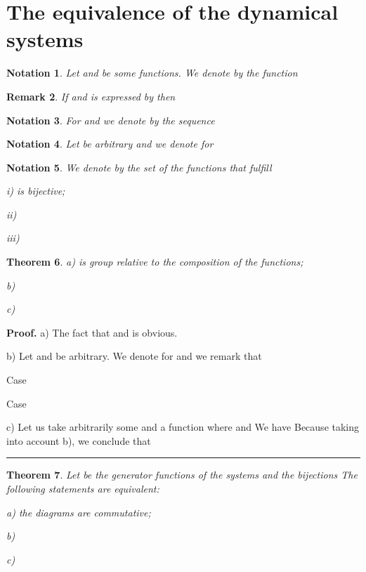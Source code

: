\documentclass[12pt]{article}\usepackage{amsmath}
\newtheorem{theorem}{Theorem}
\newtheorem{notation}[theorem]{Notation}
\newtheorem{remark}[theorem]{Remark}
\newenvironment{proof}[1][Proof]{\textbf{#1.} }{\ \rule{0.5em}{0.5em}}
\begin{document}
\section{The equivalence of the dynamical systems}

\begin{notation}
Let  and  be some functions. We denote by  the function

\end{notation}

\begin{remark}
If  and  is expressed
by
then

\end{remark}

\begin{notation}
For  and  we denote by 
the sequence 
\end{notation}

\begin{notation}
Let be  arbitrary and we denote for 

\end{notation}

\begin{notation}
We denote by  the set of the functions  that fulfill

i)  is bijective;

ii) 

iii) 

\end{notation}

\begin{theorem}
\label{The59}a)  is group relative to the composition  of the functions;

b) 

c) 
\end{theorem}

\begin{proof}
a) The fact that   and
 is obvious.

b) Let  and  be arbitrary. We denote for 
and we remark that


Case 


Case 


c) Let us take arbitrarily some  and a function 
where  and  We have
Because  taking into account b), we conclude
that 
\end{proof}

\begin{theorem}
\label{The60}Let be the generator functions  of the systems  and the
bijections  The following statements are equivalent:

a)  the diagrams
are commutative;

b) 


c) 

\end{theorem}
\end{document}

